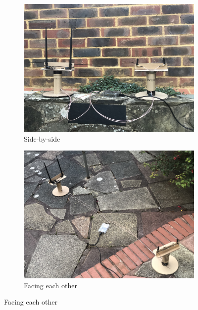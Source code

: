 \documentclass[12pt,a4paper]{report}
\begin{document}
\begin{figure}[h]
    \centering
    \begin{subfigure}{0.45\textwidth}
        \centering
        \includegraphics[width = \textwidth]{Figures/test_ue_side_by_side.jpg}
        \caption{Side-by-side}
        \label{fig:test:ue:env:sbs}
    \end{subfigure}
    \hfill
    \begin{subfigure}{0.45\textwidth}
        \centering
        \includegraphics[width = \textwidth]{Figures/test_ue_facing.jpg}
        \caption{Facing each other}
        \label{fig:test:ue:env:fac}
    \end{subfigure}
    

\end{figure}
\end{document}
